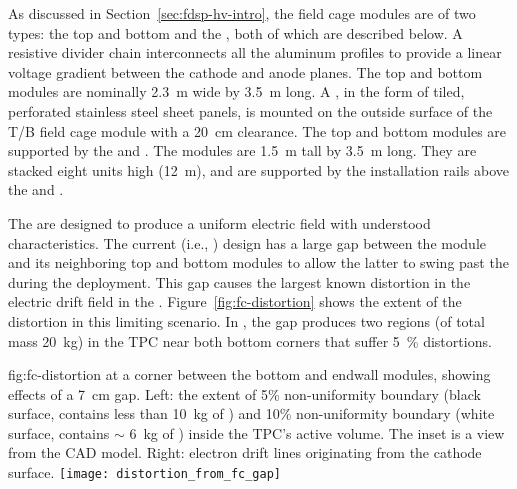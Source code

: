 As discussed in Section~\ref{sec:fdsp-hv-intro}, %
the field cage modules are of two types: the top and bottom  and the , both of which are described below. 
A resistive divider chain interconnects all the aluminum profiles to provide a linear voltage gradient between the cathode and anode planes.  The top and bottom modules are nominally \SI{2.3}{\m} wide by \SI{3.5}{\m} long. A , in the form of tiled, perforated stainless steel sheet panels, is mounted on the outside surface of the T/B field cage module with a \SI{20}{\cm} clearance. The top and bottom  modules are supported by the  and . The  modules are \SI{1.5}{\m} tall by \SI{3.5}{\m} long. They are stacked eight units high (\SI{12}{\m}), and are supported by the installation rails above the  and .

The  are designed to produce a uniform electric field with understood characteristics.
The current (i.e., )  design has a large gap between the  module and its neighboring top and bottom modules to allow the latter to swing past the  during the  deployment. This gap causes the largest known distortion in the electric drift field in the . Figure~\ref{fig:fc-distortion} shows the extent of the distortion in this limiting scenario. In , the gap produces two regions (of total \lar mass \SI{20}{kg}) in the TPC near both bottom corners that suffer \SI{5}{\%} \efield distortions.

\begin{dunefigure}
{fig:fc-distortion}
{\efield at a corner between the bottom and endwall  modules, showing effects of a \SI{7}{cm} gap. Left: the extent of \num{5}\% \efield{} non-uniformity boundary (black surface, contains less than \SI{10}{kg} of \lar) and \num{10}\% non-uniformity boundary (white surface, contains $\sim$ \SI{6}{kg} of \lar) inside the TPC's active volume. The inset is a view from the CAD model.  Right: electron drift lines originating from the cathode surface.}
\texttt{[image: distortion\_from\_fc\_gap]}
\end{dunefigure}

